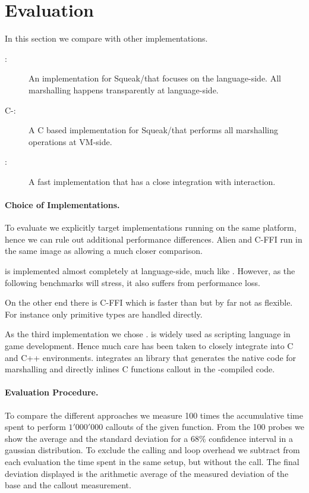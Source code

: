 \section{\NBFFI Evaluation}

In this section we compare \NB with other \FFI implementations.
\begin{description}
	\item[\Alien \FFI:] An \FFI implementation for Squeak/\PH that focuses on the language-side. All marshalling happens transparently at language-side.
	\item[C-\FFI:] A C based \FFI implementation for Squeak/\PH that performs all marshalling operations at VM-side.
	\item[\LuaJIT:] A fast \Lua implementation that has a close \FFI integration with \JIT interaction.
\end{description}

\paragraph{Choice of \FFI Implementations.}
To evaluate \NB we explicitly target \FFI implementations running on the same platform, hence we can rule out additional performance differences.
Alien and C-FFI run in the same \PH image as \NB allowing a much closer comparison.

\Alien \FFI is implemented almost completely at language-side, much like \NB.
However, as the following benchmarks will stress, it also suffers from performance loss.

On the other end there is C-FFI which is faster than \Alien but by far not as flexible.
For instance only primitive types are handled directly.

As the third implementation we chose \Lua.
\Lua is widely used as scripting language in game development.
Hence much care has been taken to closely integrate \Lua into C and C++ environments.
\LuaJIT integrates an \FFI library that generates the native code for marshalling and directly inlines C functions callout in the \JIT-compiled code.

\paragraph{Evaluation Procedure.}
To compare the different \FFI approaches we measure 100 times the accumulative time spent to perform $1'000'000$ callouts of the given function.
From the 100 probes we show the average and the standard deviation for a $68\%$ confidence interval in a gaussian distribution.
To exclude the calling and loop overhead we subtract from each evaluation the time spent in the same setup, but without the \FFI call.
The final deviation displayed is the arithmetic average of the measured deviation of the base and the callout measurement.

